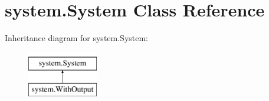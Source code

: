 \hypertarget{classsystem_1_1System}{\section{system.\-System Class Reference}
\label{classsystem_1_1System}
}
Inheritance diagram for system.\-System\-:\begin{figure}[H]
\begin{center}
\leavevmode
\includegraphics[height=2.000000cm]{d3/dd9/classsystem_1_1System}
\end{center}
\end{figure}
